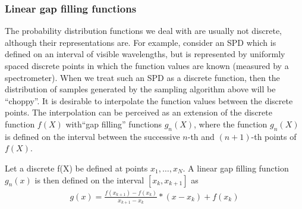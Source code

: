 \documentclass[12pt, letterpaper]{article}
\begin{document}

\subsubsection{Linear gap filling functions}

The probability distribution functions we deal with are usually not discrete, although their representations are. For example, consider an SPD which is defined on an interval of visible wavelengths, but is represented by uniformly spaced discrete points in which the function values are known (measured by a spectrometer). When we treat such an SPD as a discrete function, then the distribution of samples generated by the sampling algorithm above will be ``choppy''. 
It is desirable to interpolate the function values between the discrete points. The interpolation can be perceived as an extension of the discrete function $f(X)$ with``gap filling'' functions $g_n(X)$, where the function $g_n(X)$ is defined on the interval  between the successive $n$-th and $(n+1)$-th points of $f(X)$.

Let a discrete f(X) be defined at points $x_1, \dots, x_N$. A linear gap filling function $g_n(x)$  is then defined on the interval $[x_k, x_{k+1}]$ as
\begin{eqnarray}
g(x) = \frac{f(x_{k+1})-f(x_k)}{x_{k+1}-x_{k}} * (x - x_{k}) + f(x_{k})
\end{eqnarray}

\end{document}
